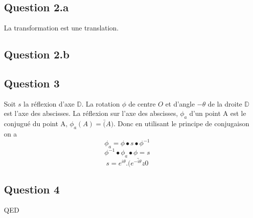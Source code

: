 \documentclass[]{book}
\theoremstyle{definition}
\newcommand{\bb}[1]{\mathbb{#1}}
\newcommand{\D}{\bb{D}}
\begin{document}
\subsection*{Question 2.a}
La transformation est une translation.

\subsection*{Question 2.b}

\subsection*{Question 3}
Soit $s$ la r\'eflexion d'axe $\D$.
La rotation $\phi$ de centre $O$ et d'angle $-\theta$ de la droite $\D$ est l'axe des abscisses. La r\'eflexion sur l'axe des abscisses, $\phi_a$  d'un point A est le conjugu\'e du point A, $\phi_a(A) = \bar(A)$. Donc en utilisant le principe de conjugaison on a 
$$\phi_a = \phi \bullet s \bullet \phi^{-1}$$
$$\phi^{-1} \bullet \phi_a \bullet \phi = s$$
$$s = e^{i\theta}.\bar{(e^{-i\theta}z0}$$

\subsection*{Question 4}
 





QED
\end{document}
